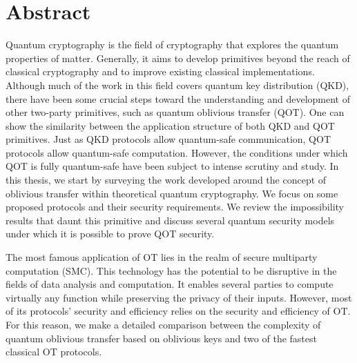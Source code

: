 
\chapter*{Abstract}

Quantum cryptography is the field of cryptography that explores the quantum properties of matter. Generally, it aims to develop primitives beyond the reach of classical cryptography and to improve existing classical implementations. Although much of the work in this field covers quantum key distribution (QKD), there have been some crucial steps toward the understanding and development of other two-party primitives, such as quantum oblivious transfer (QOT). One can show the similarity between the application structure of both QKD and QOT primitives. Just as QKD protocols allow quantum-safe communication, QOT protocols allow quantum-safe computation. However, the conditions under which QOT is fully quantum-safe have been subject to intense scrutiny and study. In this thesis, we start by surveying the work developed around the concept of oblivious transfer within theoretical quantum cryptography. We focus on some proposed protocols and their security requirements. We review the impossibility results that daunt this primitive and discuss several quantum security models under which it is possible to prove QOT security. 

The most famous application of OT lies in the realm of secure multiparty computation (SMC). This technology has the potential to be disruptive in the fields of data analysis and computation. It enables several parties to compute virtually any function while preserving the privacy of their inputs. However, most of its protocols’ security and efficiency relies on the security and efficiency of OT. For this reason, we make a detailed comparison between the complexity of quantum oblivious transfer based on oblivious keys and two of the fastest classical OT protocols.

